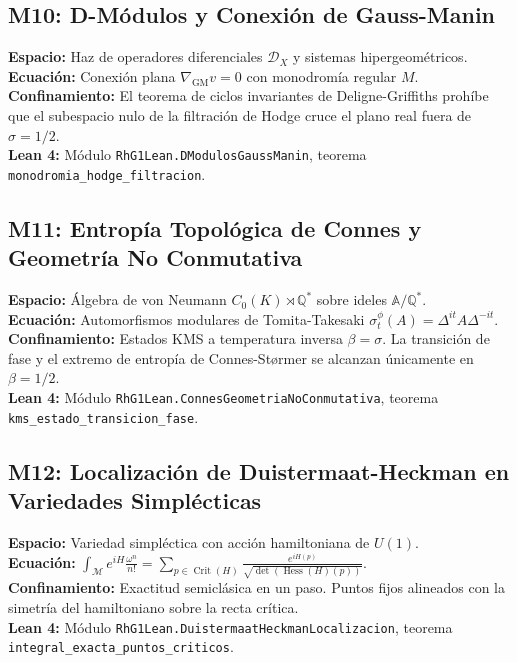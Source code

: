 \documentclass[11pt,a4paper]{article}
\begin{document}
\subsection{M10: D-Módulos y Conexión de Gauss-Manin}
\textbf{Espacio:} Haz de operadores diferenciales $\mathcal{D}_X$ y sistemas hipergeométricos.\\
\textbf{Ecuación:} Conexión plana $\nabla_{\text{GM}} v = 0$ con monodromía regular $M$.\\
\textbf{Confinamiento:} El teorema de ciclos invariantes de Deligne-Griffiths prohíbe que el subespacio nulo de la filtración de Hodge cruce el plano real fuera de $\sigma = 1/2$.\\
\textbf{Lean 4:} Módulo \texttt{RhG1Lean.DModulosGaussManin}, teorema \texttt{monodromia\_hodge\_filtracion}.

\subsection{M11: Entropía Topológica de Connes y Geometría No Conmutativa}
\textbf{Espacio:} Álgebra de von Neumann $C_0(K) \rtimes \mathbb{Q}^*$ sobre ideles $\mathbb{A}/\mathbb{Q}^*$.\\
\textbf{Ecuación:} Automorfismos modulares de Tomita-Takesaki $\sigma_t^\phi(A) = \Delta^{it} A \Delta^{-it}$.\\
\textbf{Confinamiento:} Estados KMS a temperatura inversa $\beta = \sigma$. La transición de fase y el extremo de entropía de Connes-Størmer se alcanzan únicamente en $\beta = 1/2$.\\
\textbf{Lean 4:} Módulo \texttt{RhG1Lean.ConnesGeometriaNoConmutativa}, teorema \texttt{kms\_estado\_transicion\_fase}.

\subsection{M12: Localización de Duistermaat-Heckman en Variedades Simplécticas}
\textbf{Espacio:} Variedad simpléctica con acción hamiltoniana de $U(1)$.\\
\textbf{Ecuación:} $\int_{\mathcal{M}} e^{iH} \frac{\omega^n}{n!} = \sum_{p \in \operatorname{Crit}(H)} \frac{e^{iH(p)}}{\sqrt{\det(\operatorname{Hess}(H)(p))}}$.\\
\textbf{Confinamiento:} Exactitud semiclásica en un paso. Puntos fijos alineados con la simetría del hamiltoniano sobre la recta crítica.\\
\textbf{Lean 4:} Módulo \texttt{RhG1Lean.DuistermaatHeckmanLocalizacion}, teorema \texttt{integral\_exacta\_puntos\_criticos}.
\end{document}

